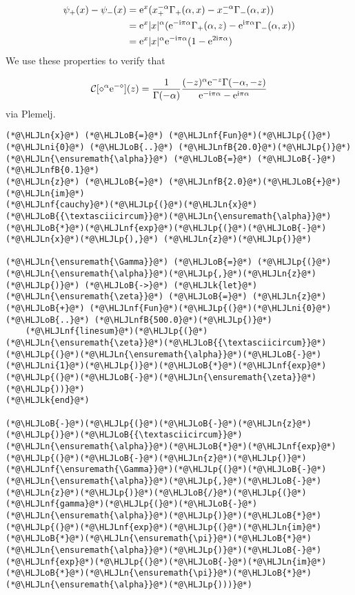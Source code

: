 \documentclass[12pt,landscape]{article}
\newcommand{\HLJLk}[1]{\textcolor[RGB]{148,91,176}{\textbf{#1}}}
\newcommand{\HLJLn}[1]{#1}
\newcommand{\HLJLnf}[1]{\textcolor[RGB]{66,102,213}{#1}}
\newcommand{\HLJLnfB}[1]{\textcolor[RGB]{59,151,46}{#1}}
\newcommand{\HLJLni}[1]{\textcolor[RGB]{59,151,46}{#1}}
\newcommand{\HLJLoB}[1]{\textcolor[RGB]{102,102,102}{\textbf{#1}}}
\newcommand{\HLJLp}[1]{#1}
\def\I{ {\rm i} }
\def\E{ {\rm e} }
\def\CC{ {\cal C} }
\def\addtab#1={#1\;&=}
\def\ccr{\\\addtab}
\def\addtab#1={#1\;&=}
\def\ccr{\\\addtab}
\begin{document}
{\begin{align*}
\psi_+(x) - \psi_-(x) &= \E^x(x_+^{-\alpha} \Gamma_+(\alpha, x) -  x_-^{-\alpha}\Gamma_-(\alpha, x)) \ccr
= \E^x |x|^\alpha (\E^{-\I \pi \alpha} \Gamma_+(\alpha, z) - \E^{\I \pi \alpha} \Gamma_-(\alpha,x)) \ccr
 = \E^x |x|^\alpha \E^{-\I \pi \alpha} (1-\E^{2 \I \pi \alpha})
\end{align*}
We use these properties to verify that

\[
\CC[\diamond^\alpha \E^{-\diamond}](z) = {1 \over \Gamma(-\alpha)} {(-z)^\alpha \E^{-z} \Gamma(-\alpha, - z) \over
  \E^{-\I\pi\alpha} - \E^{\I\pi\alpha}}
\]
via Plemelj.


\begin{lstlisting}
(*@\HLJLn{x}@*) (*@\HLJLoB{=}@*) (*@\HLJLnf{Fun}@*)(*@\HLJLp{(}@*)(*@\HLJLni{0}@*) (*@\HLJLoB{..}@*) (*@\HLJLnfB{20.0}@*)(*@\HLJLp{)}@*)
(*@\HLJLn{\ensuremath{\alpha}}@*) (*@\HLJLoB{=}@*) (*@\HLJLoB{-}@*)(*@\HLJLnfB{0.1}@*)
(*@\HLJLn{z}@*) (*@\HLJLoB{=}@*) (*@\HLJLnfB{2.0}@*)(*@\HLJLoB{+}@*)(*@\HLJLn{im}@*)
(*@\HLJLnf{cauchy}@*)(*@\HLJLp{(}@*)(*@\HLJLn{x}@*)(*@\HLJLoB{{\textasciicircum}}@*)(*@\HLJLn{\ensuremath{\alpha}}@*)(*@\HLJLoB{*}@*)(*@\HLJLnf{exp}@*)(*@\HLJLp{(}@*)(*@\HLJLoB{-}@*)(*@\HLJLn{x}@*)(*@\HLJLp{),}@*) (*@\HLJLn{z}@*)(*@\HLJLp{)}@*)

(*@\HLJLn{\ensuremath{\Gamma}}@*) (*@\HLJLoB{=}@*) (*@\HLJLp{(}@*)(*@\HLJLn{\ensuremath{\alpha}}@*)(*@\HLJLp{,}@*)(*@\HLJLn{z}@*)(*@\HLJLp{)}@*) (*@\HLJLoB{->}@*) (*@\HLJLk{let}@*) (*@\HLJLn{\ensuremath{\zeta}}@*) (*@\HLJLoB{=}@*) (*@\HLJLn{z}@*) (*@\HLJLoB{+}@*) (*@\HLJLnf{Fun}@*)(*@\HLJLp{(}@*)(*@\HLJLni{0}@*) (*@\HLJLoB{..}@*) (*@\HLJLnfB{500.0}@*)(*@\HLJLp{)}@*)
    (*@\HLJLnf{linesum}@*)(*@\HLJLp{(}@*)(*@\HLJLn{\ensuremath{\zeta}}@*)(*@\HLJLoB{{\textasciicircum}}@*)(*@\HLJLp{(}@*)(*@\HLJLn{\ensuremath{\alpha}}@*)(*@\HLJLoB{-}@*)(*@\HLJLni{1}@*)(*@\HLJLp{)}@*)(*@\HLJLoB{*}@*)(*@\HLJLnf{exp}@*)(*@\HLJLp{(}@*)(*@\HLJLoB{-}@*)(*@\HLJLn{\ensuremath{\zeta}}@*)(*@\HLJLp{))}@*)
(*@\HLJLk{end}@*)

(*@\HLJLoB{-}@*)(*@\HLJLp{(}@*)(*@\HLJLoB{-}@*)(*@\HLJLn{z}@*)(*@\HLJLp{)}@*)(*@\HLJLoB{{\textasciicircum}}@*)(*@\HLJLn{\ensuremath{\alpha}}@*)(*@\HLJLoB{*}@*)(*@\HLJLnf{exp}@*)(*@\HLJLp{(}@*)(*@\HLJLoB{-}@*)(*@\HLJLn{z}@*)(*@\HLJLp{)}@*)(*@\HLJLnf{\ensuremath{\Gamma}}@*)(*@\HLJLp{(}@*)(*@\HLJLoB{-}@*)(*@\HLJLn{\ensuremath{\alpha}}@*)(*@\HLJLp{,}@*)(*@\HLJLoB{-}@*)(*@\HLJLn{z}@*)(*@\HLJLp{)}@*)(*@\HLJLoB{/}@*)(*@\HLJLp{(}@*)(*@\HLJLnf{gamma}@*)(*@\HLJLp{(}@*)(*@\HLJLoB{-}@*)(*@\HLJLn{\ensuremath{\alpha}}@*)(*@\HLJLp{)}@*)(*@\HLJLoB{*}@*)(*@\HLJLp{(}@*)(*@\HLJLnf{exp}@*)(*@\HLJLp{(}@*)(*@\HLJLn{im}@*)(*@\HLJLoB{*}@*)(*@\HLJLn{\ensuremath{\pi}}@*)(*@\HLJLoB{*}@*)(*@\HLJLn{\ensuremath{\alpha}}@*)(*@\HLJLp{)}@*)(*@\HLJLoB{-}@*)(*@\HLJLnf{exp}@*)(*@\HLJLp{(}@*)(*@\HLJLoB{-}@*)(*@\HLJLn{im}@*)(*@\HLJLoB{*}@*)(*@\HLJLn{\ensuremath{\pi}}@*)(*@\HLJLoB{*}@*)(*@\HLJLn{\ensuremath{\alpha}}@*)(*@\HLJLp{)))}@*)
\end{lstlisting}

}
\end{document}
